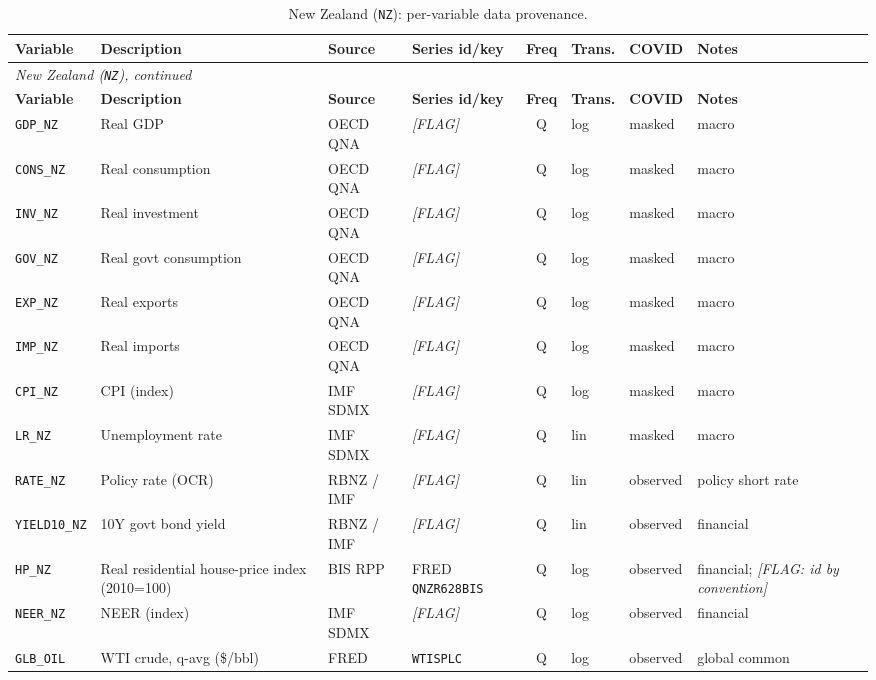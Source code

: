 {\small
\begin{longtable}{@{}lp{2.9cm}p{1.9cm}p{2.0cm}cp{1.4cm}p{1.7cm}p{2.6cm}@{}}
\caption{New Zealand (\texttt{NZ}): per-variable data provenance.}\label{tab:data:NZ}\\
\toprule
\textbf{Variable} & \textbf{Description} & \textbf{Source} & \textbf{Series id/key} & \textbf{Freq} & \textbf{Trans.} & \textbf{COVID} & \textbf{Notes}\\
\midrule
\endfirsthead
\multicolumn{8}{l}{\small\itshape New Zealand (\texttt{NZ}), continued}\\
\toprule
\textbf{Variable} & \textbf{Description} & \textbf{Source} & \textbf{Series id/key} & \textbf{Freq} & \textbf{Trans.} & \textbf{COVID} & \textbf{Notes}\\
\midrule
\endhead
\bottomrule
\endfoot
\texttt{GDP\_NZ} & Real GDP & OECD QNA & \textit{[FLAG]} & Q & log & masked & macro\\
\texttt{CONS\_NZ} & Real consumption & OECD QNA & \textit{[FLAG]} & Q & log & masked & macro\\
\texttt{INV\_NZ} & Real investment & OECD QNA & \textit{[FLAG]} & Q & log & masked & macro\\
\texttt{GOV\_NZ} & Real govt consumption & OECD QNA & \textit{[FLAG]} & Q & log & masked & macro\\
\texttt{EXP\_NZ} & Real exports & OECD QNA & \textit{[FLAG]} & Q & log & masked & macro\\
\texttt{IMP\_NZ} & Real imports & OECD QNA & \textit{[FLAG]} & Q & log & masked & macro\\
\texttt{CPI\_NZ} & CPI (index) & IMF SDMX & \textit{[FLAG]} & Q & log & masked & macro\\
\texttt{LR\_NZ} & Unemployment rate & IMF SDMX & \textit{[FLAG]} & Q & lin & masked & macro\\
\texttt{RATE\_NZ} & Policy rate (OCR) & RBNZ / IMF & \textit{[FLAG]} & Q & lin & observed & policy short rate\\
\texttt{YIELD10\_NZ} & 10Y govt bond yield & RBNZ / IMF & \textit{[FLAG]} & Q & lin & observed & financial\\
\texttt{HP\_NZ} & Real residential house-price index (2010=100) & BIS RPP & FRED \texttt{QNZR628BIS} & Q & log & observed & financial; \textit{[FLAG: id by convention]}\\
\texttt{NEER\_NZ} & NEER (index) & IMF SDMX & \textit{[FLAG]} & Q & log & observed & financial\\
\texttt{GLB\_OIL} & WTI crude, q-avg (\$/bbl) & FRED & \texttt{WTISPLC} & Q & log & observed & global common\\

\end{longtable}}
